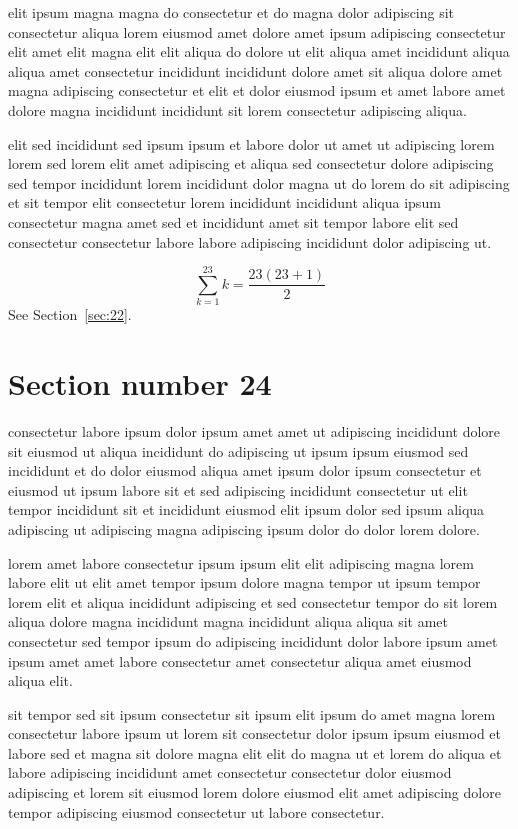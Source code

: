 \documentclass{article}
\begin{document}
elit ipsum magna magna do consectetur et do magna dolor adipiscing sit consectetur aliqua lorem eiusmod amet dolore amet ipsum adipiscing consectetur elit amet elit magna elit elit aliqua do dolore ut elit aliqua amet incididunt aliqua aliqua amet consectetur incididunt incididunt dolore amet sit aliqua dolore amet magna adipiscing consectetur et elit et dolor eiusmod ipsum et amet labore amet dolore magna incididunt incididunt sit lorem consectetur adipiscing aliqua.

elit sed incididunt sed ipsum ipsum et labore dolor ut amet ut adipiscing lorem lorem sed lorem elit amet adipiscing et aliqua sed consectetur dolore adipiscing sed tempor incididunt lorem incididunt dolor magna ut do lorem do sit adipiscing et sit tempor elit consectetur lorem incididunt incididunt aliqua ipsum consectetur magna amet sed et incididunt amet sit tempor labore elit sed consectetur consectetur labore labore adipiscing incididunt dolor adipiscing ut.

\begin{equation} \sum_{k=1}^{23} k = \frac{23(23+1)}{2} \end{equation}
See Section~\ref{sec:22}.

\section{Section number 24}\label{sec:24}
consectetur labore ipsum dolor ipsum amet amet ut adipiscing incididunt dolore sit eiusmod ut aliqua incididunt do adipiscing ut ipsum ipsum eiusmod sed incididunt et do dolor eiusmod aliqua amet ipsum dolor ipsum consectetur et eiusmod ut ipsum labore sit et sed adipiscing incididunt consectetur ut elit tempor incididunt sit et incididunt eiusmod elit ipsum dolor sed ipsum aliqua adipiscing ut adipiscing magna adipiscing ipsum dolor do dolor lorem dolore.

lorem amet labore consectetur ipsum ipsum elit elit adipiscing magna lorem labore elit ut elit amet tempor ipsum dolore magna tempor ut ipsum tempor lorem elit et aliqua incididunt adipiscing et sed consectetur tempor do sit lorem aliqua dolore magna incididunt magna incididunt aliqua aliqua sit amet consectetur sed tempor ipsum do adipiscing incididunt dolor labore ipsum amet ipsum amet amet labore consectetur amet consectetur aliqua amet eiusmod aliqua elit.

sit tempor sed sit ipsum consectetur sit ipsum elit ipsum do amet magna lorem consectetur labore ipsum ut lorem sit consectetur dolor ipsum ipsum eiusmod et labore sed et magna sit dolore magna elit elit do magna ut et lorem do aliqua et labore adipiscing incididunt amet consectetur consectetur dolor eiusmod adipiscing et lorem sit eiusmod lorem dolore eiusmod elit amet adipiscing dolore tempor adipiscing eiusmod consectetur ut labore consectetur.
\end{document}
